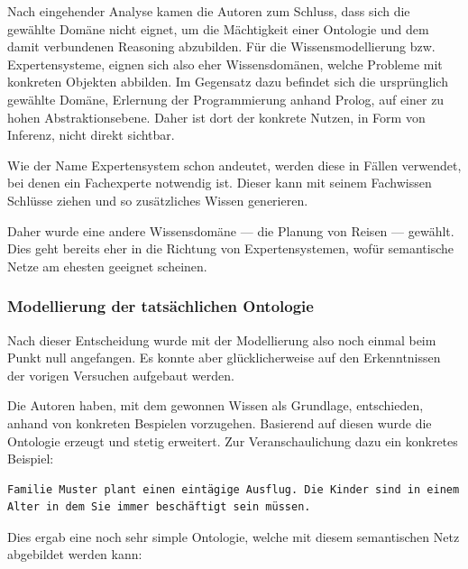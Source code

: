 Nach eingehender Analyse kamen die Autoren zum Schluss, dass sich die gewählte Domäne nicht eignet, um die Mächtigkeit einer Ontologie und dem damit verbundenen Reasoning abzubilden. Für die Wissensmodellierung bzw. Expertensysteme, eignen sich also eher Wissensdomänen, welche Probleme mit konkreten Objekten abbilden. Im Gegensatz dazu befindet sich die ursprünglich gewählte Domäne, Erlernung der Programmierung anhand Prolog, auf einer zu hohen Abstraktionsebene. Daher ist dort der konkrete Nutzen, in Form von Inferenz, nicht direkt sichtbar.

Wie der Name Expertensystem schon andeutet, werden diese in Fällen verwendet, bei denen ein Fachexperte notwendig ist. Dieser kann mit seinem Fachwissen Schlüsse ziehen und so zusätzliches Wissen generieren.

Daher wurde eine andere Wissensdomäne --- die Planung von Reisen --- gewählt. Dies geht bereits eher in die Richtung von Expertensystemen, wofür semantische Netze am ehesten geeignet scheinen.

\subsubsection{Modellierung der tatsächlichen Ontologie}
\label{sub:modellierung_der_ontologie_tatsaechliche}

Nach dieser Entscheidung wurde mit der Modellierung also noch einmal beim Punkt null angefangen. Es konnte aber glücklicherweise auf den Erkenntnissen der vorigen Versuchen aufgebaut werden.

Die Autoren haben, mit dem gewonnen Wissen als Grundlage, entschieden, anhand von konkreten Bespielen vorzugehen. Basierend auf diesen wurde die Ontologie erzeugt und stetig erweitert. Zur Veranschaulichung dazu ein konkretes Beispiel:

\begin{lstlisting}[caption={Konkretes Beispiel einer Reiseplanung.},captionpos=b]
    Familie Muster plant einen eintägige Ausflug. Die Kinder sind in einem Alter in dem Sie immer beschäftigt sein müssen.
\end{lstlisting}

\newpage

Dies ergab eine noch sehr simple Ontologie, welche mit diesem semantischen Netz abgebildet werden kann:

